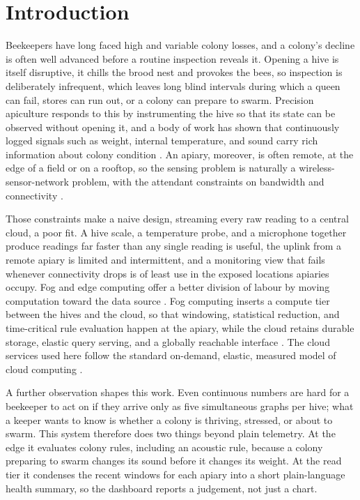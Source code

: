 \documentclass[conference]{IEEEtran}
\begin{document}
\section{Introduction}

Beekeepers have long faced high and variable colony losses, and a colony's decline is often well advanced before a routine inspection reveals it. Opening a hive is itself disruptive, it chills the brood nest and provokes the bees, so inspection is deliberately infrequent, which leaves long blind intervals during which a queen can fail, stores can run out, or a colony can prepare to swarm. Precision apiculture responds to this by instrumenting the hive so that its state can be observed without opening it, and a body of work has shown that continuously logged signals such as weight, internal temperature, and sound carry rich information about colony condition \cite{zacepins2015, meikle2015}. An apiary, moreover, is often remote, at the edge of a field or on a rooftop, so the sensing problem is naturally a wireless-sensor-network problem, with the attendant constraints on bandwidth and connectivity \cite{akyildiz2002}.

Those constraints make a naive design, streaming every raw reading to a central cloud, a poor fit. A hive scale, a temperature probe, and a microphone together produce readings far faster than any single reading is useful, the uplink from a remote apiary is limited and intermittent, and a monitoring view that fails whenever connectivity drops is of least use in the exposed locations apiaries occupy. Fog and edge computing offer a better division of labour by moving computation toward the data source \cite{shi2016}. Fog computing inserts a compute tier between the hives and the cloud, so that windowing, statistical reduction, and time-critical rule evaluation happen at the apiary, while the cloud retains durable storage, elastic query serving, and a globally reachable interface \cite{bonomi2012, naha2018}. The cloud services used here follow the standard on-demand, elastic, measured model of cloud computing \cite{mell2011}.

A further observation shapes this work. Even continuous numbers are hard for a beekeeper to act on if they arrive only as five simultaneous graphs per hive; what a keeper wants to know is whether a colony is thriving, stressed, or about to swarm. This system therefore does two things beyond plain telemetry. At the edge it evaluates colony rules, including an acoustic rule, because a colony preparing to swarm changes its sound before it changes its weight. At the read tier it condenses the recent windows for each apiary into a short plain-language health summary, so the dashboard reports a judgement, not just a chart.
\end{document}
